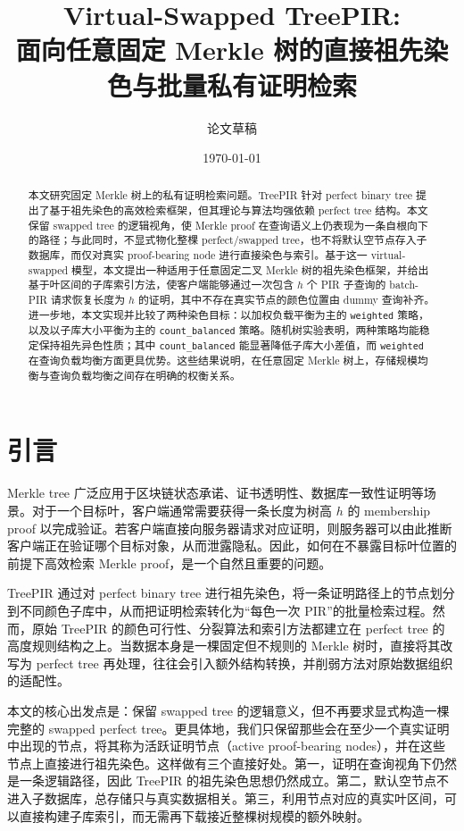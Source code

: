 \documentclass[UTF8]{ctexart}
\title{Virtual-Swapped TreePIR:\\面向任意固定 Merkle 树的直接祖先染色与批量私有证明检索}
\author{论文草稿}
\date{\today}
\begin{document}
	
	\maketitle
	
	\begin{abstract}
		本文研究固定 Merkle 树上的私有证明检索问题。TreePIR 针对 perfect binary tree 提出了基于祖先染色的高效检索框架，但其理论与算法均强依赖 perfect tree 结构。本文保留 swapped tree 的逻辑视角，使 Merkle proof 在查询语义上仍表现为一条自根向下的路径；与此同时，不显式物化整棵 perfect/swapped tree，也不将默认空节点存入子数据库，而仅对真实 proof-bearing node 进行直接染色与索引。基于这一 virtual-swapped 模型，本文提出一种适用于任意固定二叉 Merkle 树的祖先染色框架，并给出基于叶区间的子库索引方法，使客户端能够通过一次包含 $h$ 个 PIR 子查询的 batch-PIR 请求恢复长度为 $h$ 的证明，其中不存在真实节点的颜色位置由 dummy 查询补齐。进一步地，本文实现并比较了两种染色目标：以加权负载平衡为主的 \texttt{weighted} 策略，以及以子库大小平衡为主的 \texttt{count\_balanced} 策略。随机树实验表明，两种策略均能稳定保持祖先异色性质；其中 \texttt{count\_balanced} 能显著降低子库大小差值，而 \texttt{weighted} 在查询负载均衡方面更具优势。这些结果说明，在任意固定 Merkle 树上，存储规模均衡与查询负载均衡之间存在明确的权衡关系。
	\end{abstract}
	
	\section{引言}
	
	Merkle tree 广泛应用于区块链状态承诺、证书透明性、数据库一致性证明等场景。对于一个目标叶，客户端通常需要获得一条长度为树高 $h$ 的 membership proof 以完成验证。若客户端直接向服务器请求对应证明，则服务器可以由此推断客户端正在验证哪个目标对象，从而泄露隐私。因此，如何在不暴露目标叶位置的前提下高效检索 Merkle proof，是一个自然且重要的问题。
	
	TreePIR 通过对 perfect binary tree 进行祖先染色，将一条证明路径上的节点划分到不同颜色子库中，从而把证明检索转化为“每色一次 PIR”的批量检索过程。然而，原始 TreePIR 的颜色可行性、分裂算法和索引方法都建立在 perfect tree 的高度规则结构之上。当数据本身是一棵固定但不规则的 Merkle 树时，直接将其改写为 perfect tree 再处理，往往会引入额外结构转换，并削弱方法对原始数据组织的适配性。
	
	本文的核心出发点是：保留 swapped tree 的逻辑意义，但不再要求显式构造一棵完整的 swapped perfect tree。更具体地，我们只保留那些会在至少一个真实证明中出现的节点，将其称为活跃证明节点（active proof-bearing nodes），并在这些节点上直接进行祖先染色。这样做有三个直接好处。第一，证明在查询视角下仍然是一条逻辑路径，因此 TreePIR 的祖先染色思想仍然成立。第二，默认空节点不进入子数据库，总存储只与真实数据相关。第三，利用节点对应的真实叶区间，可以直接构建子库索引，而无需再下载接近整棵树规模的额外映射。
	
\end{document}
